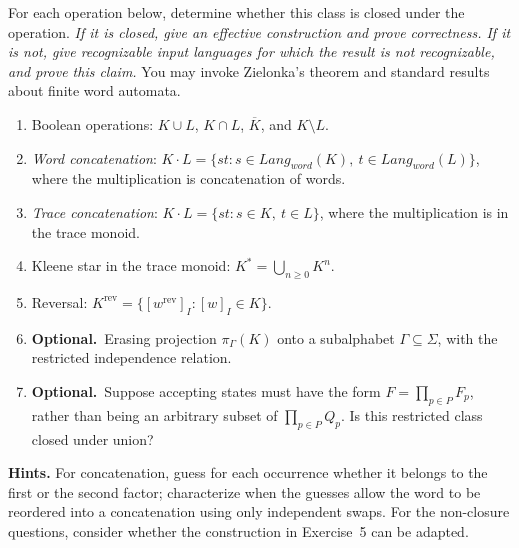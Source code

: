 \documentclass[10pt,a4paper]{article}
\newcommand{\extra}{\textbf{Optional.}\ }
\begin{document}
For each operation below, determine whether this class is closed under the
operation. \emph{If it is closed, give an effective construction and prove
correctness. If it is not, give recognizable input languages for which the
result is not recognizable, and prove this claim.} You may invoke Zielonka's
theorem and standard results about finite word automata.
\begin{enumerate}
\item Boolean operations: $K\cup L$, $K\cap L$, $\overline K$, and $K\setminus L$.
\item \emph{Word concatenation}:
      $K\cdot L=\{st:s\in Lang_{word}(K),\ t\in Lang_{word}(L)\}$,
      where the multiplication is concatenation of words.
\item \emph{Trace concatenation}:
      $K\cdot L=\{st:s\in K,\ t\in L\}$,
      where the multiplication is in the trace monoid.
\item Kleene star in the trace monoid: $K^*=\bigcup_{n\geq 0}K^n$.
\item Reversal: $K^{\mathrm{rev}}=\{[w^{\mathrm{rev}}]_I:[w]_I\in K\}$.
\item \extra Erasing projection $\pi_\Gamma(K)$ onto a subalphabet
      $\Gamma\subseteq\Sigma$, with the restricted independence relation.
\item \extra Suppose accepting states must have the form
      $F=\prod_{p\in P}F_p$, rather than being an arbitrary subset of
      $\prod_{p\in P}Q_p$. Is this restricted class closed under union?
\end{enumerate}
\textbf{Hints.}
For concatenation, guess for each occurrence whether it belongs to the
first or the second factor; characterize when the guesses allow the word
to be reordered into a concatenation using only independent swaps.
For the non-closure questions, consider whether the construction in
Exercise~5 can be adapted.
\end{document}
